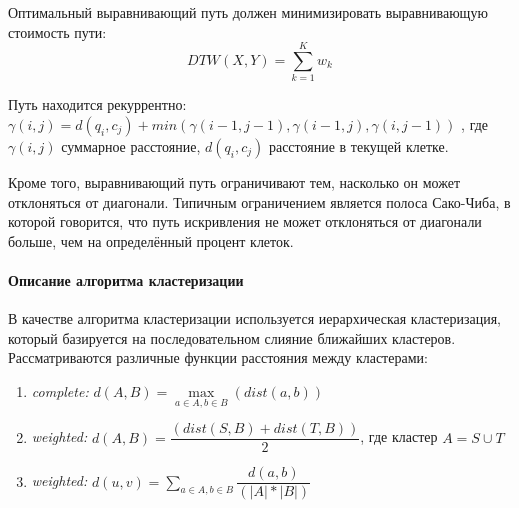 \documentclass[12pt,twoside]{article}
\begin{document}
        Оптимальный выравнивающий путь должен минимизировать выравнивающую стоимость пути:
            $$
                DTW(X, Y)=\displaystyle\sum\limits_{k=1}^{K} w_k
            $$
            
        Путь находится рекуррентно:\\
            $\gamma(i, j) = d(q_i, c_j) + min({\gamma(i-1, j-1), \gamma(i-1, j), \gamma(i, j-1)})$ ,
            где $\gamma(i, j)$ суммарное расстояние, $d(q_i, c_j)$ расстояние в текущей клетке.
						
                Кроме того, выравнивающий путь ограничивают тем, насколько он может отклоняться от диагонали.
                Типичным ограничением является полоса Сако-Чиба, в которой говорится, что путь искривления не может отклоняться от диагонали больше,
                чем на определённый процент клеток.

	\paragraph{Описание алгоритма кластеризации}      
        В качестве алгоритма кластеризации используется иерархическая кластеризация, который базируется на последовательном слияние ближайших кластеров.
        Рассматриваются различные функции расстояния между кластерами: 
        \begin{enumerate}[label=\arabic*)]
            \item \textit{complete:}  $d(A, B) = \max\limits_{a \in A, b \in B}(dist(a, b))$ 
            \item \textit{weighted:}  $d(A,B) = \dfrac{(dist(S,B) + dist(T,B))}{2}$, где кластер $A = S \cup T$
            \item \textit{weighted:}  $d(u,v) = \sum\limits_{a \in A, b \in B} \dfrac{d(a, b)}{(|A|*|B|)}$ 
        \end{enumerate} 



\end{document}
